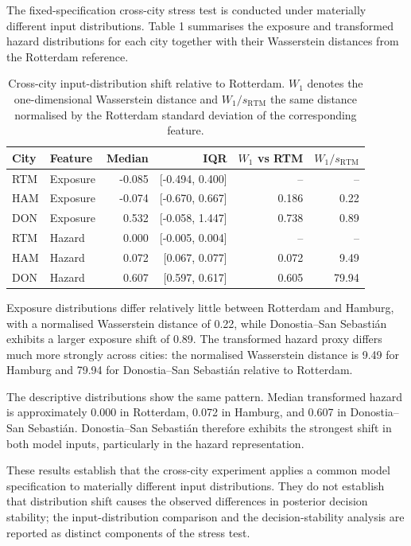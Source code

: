 \documentclass[
]{article}
\begin{document}
The fixed-specification cross-city stress test is conducted under
materially different input distributions. Table 1 summarises the
exposure and transformed hazard distributions for each city together
with their Wasserstein distances from the Rotterdam reference.

\begin{table}[H]
\centering
\small
\begin{tabular}{llrrrr}
\toprule
City & Feature & Median & IQR & $W_1$ vs RTM & $W_1 / s_{\mathrm{RTM}}$ \\
\midrule
RTM & Exposure & -0.085 & [-0.494, 0.400] & -- & -- \\
HAM & Exposure & -0.074 & [-0.670, 0.667] & 0.186 & 0.22 \\
DON & Exposure & 0.532 & [-0.058, 1.447] & 0.738 & 0.89 \\
RTM & Hazard & 0.000 & [-0.005, 0.004] & -- & -- \\
HAM & Hazard & 0.072 & [0.067, 0.077] & 0.072 & 9.49 \\
DON & Hazard & 0.607 & [0.597, 0.617] & 0.605 & 79.94 \\
\bottomrule
\end{tabular}
\caption{Cross-city input-distribution shift relative to Rotterdam. $W_1$ denotes the one-dimensional Wasserstein distance and $W_1 / s_{\mathrm{RTM}}$ the same distance normalised by the Rotterdam standard deviation of the corresponding feature.}
\end{table}

Exposure distributions differ relatively little between Rotterdam and
Hamburg, with a normalised Wasserstein distance of 0.22, while
Donostia--San Sebastián exhibits a larger exposure shift of 0.89. The
transformed hazard proxy differs much more strongly across cities: the
normalised Wasserstein distance is 9.49 for Hamburg and 79.94 for
Donostia--San Sebastián relative to Rotterdam.

The descriptive distributions show the same pattern. Median transformed
hazard is approximately 0.000 in Rotterdam, 0.072 in Hamburg, and 0.607
in Donostia--San Sebastián. Donostia--San Sebastián therefore exhibits
the strongest shift in both model inputs, particularly in the hazard
representation.

These results establish that the cross-city experiment applies a common
model specification to materially different input distributions. They do
not establish that distribution shift causes the observed differences in
posterior decision stability; the input-distribution comparison and the
decision-stability analysis are reported as distinct components of the
stress test.
\end{document}
